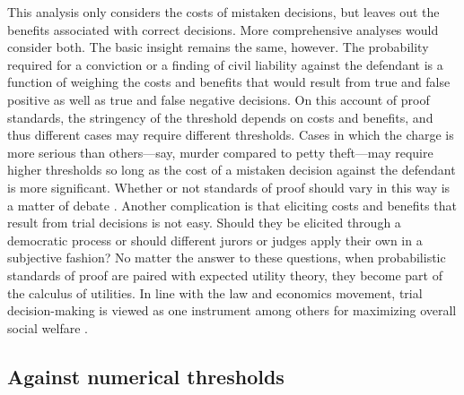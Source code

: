 \documentclass{article}
\begin{document}
This analysis only considers the costs of mistaken decisions, but leaves out the benefits associated with correct decisions. More comprehensive analyses would consider both. The basic insight remains the same, however. The probability required for a conviction or a finding of civil liability against the defendant is a function of weighing the  costs and benefits that would result from true and false positive as well as true and false negative decisions. On this account of proof standards, the stringency of the threshold depends on costs and benefits, and thus different cases may require different thresholds. Cases in which the charge is more serious than others---say, murder compared to petty theft---may require higher thresholds so long as the cost of a mistaken decision against the defendant is more significant. %
Whether or not standards of proof should vary in this way is a matter of debate \citep{kaplow2012, picinali2013}.
 Another complication is that eliciting costs and benefits that result from trial decisions is not easy.  Should they be elicited through a democratic process or should different jurors or judges apply their own in a subjective fashion? 
No matter the answer to these questions, when probabilistic standards of proof are paired with expected utility theory, they become part of the calculus of utilities. In line with the law and economics movement, trial decision-making is viewed as one instrument among others  for maximizing overall social welfare \citep{Posner1973}. 


\subsection{Against numerical thresholds}
\end{document}
